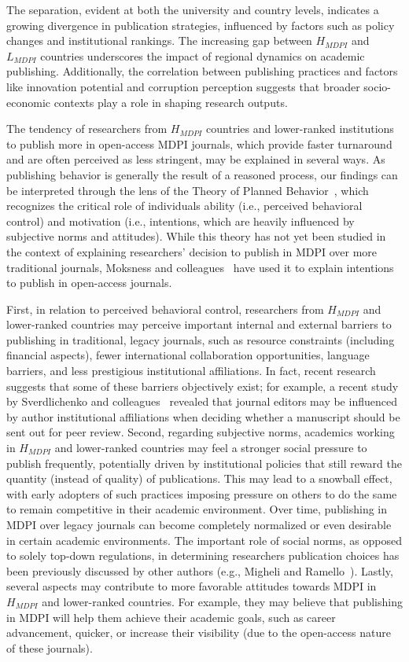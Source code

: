 \documentclass[amsfonts, amssymb, prl, superscriptaddress, notitlepage, twocolumn, nofootinbib]{revtex4-2}
\begin{document}
The separation, evident at both the university and country levels, indicates a growing divergence in publication strategies, influenced by factors such as policy changes and institutional rankings. The increasing gap between $H_{MDPI}$ and $L_{MDPI}$ countries underscores the impact of regional dynamics on academic publishing. Additionally, the correlation between publishing practices and factors like innovation potential and corruption perception suggests that broader socio-economic contexts play a role in shaping research outputs. 

The tendency of researchers from $H_{MDPI}$ countries and lower-ranked institutions to publish more in open-access MDPI journals, which provide faster turnaround and are often perceived as less stringent, may be explained in several ways. As publishing behavior is generally the result of a reasoned process, our findings can be interpreted through the lens of the Theory of Planned Behavior~\cite{ajzen1991}, which recognizes the critical role of individuals ability (i.e., perceived behavioral control) and motivation (i.e., intentions, which are heavily influenced by subjective norms and attitudes). While this theory has not yet been studied in the context of explaining researchers’ decision to publish in MDPI over more traditional journals, Moksness and colleagues~\cite{moksness2020} have used it to explain intentions to publish in open-access journals.

First, in relation to perceived behavioral control, researchers from $H_{MDPI}$ and lower-ranked countries may perceive important internal and external barriers to publishing in traditional, legacy journals, such as resource constraints (including financial aspects), fewer international collaboration opportunities, language barriers, and less prestigious institutional affiliations. In fact, recent research suggests that some of these barriers objectively exist; for example, a recent study by Sverdlichenko and colleagues~\cite{sverdlichenko2022} revealed that journal editors may be influenced by author institutional affiliations when deciding whether a manuscript should be sent out for peer review. Second, regarding subjective norms, academics working in $H_{MDPI}$ and lower-ranked countries may feel a stronger social pressure to publish frequently, potentially driven by institutional policies that still reward the quantity (instead of quality) of publications. This may lead to a snowball effect, with early adopters of such practices imposing pressure on others to do the same to remain competitive in their academic environment. Over time, publishing in MDPI over legacy journals can become completely normalized or even desirable in certain academic environments. The important role of social norms, as opposed to solely top-down regulations, in determining researchers publication choices has been previously discussed by other authors (e.g., Migheli and Ramello~\cite{migheli2013}). Lastly, several aspects may contribute to more favorable attitudes towards MDPI in $H_{MDPI}$ and lower-ranked countries. For example, they may believe that publishing in MDPI will help them achieve their academic goals, such as career advancement, quicker, or increase their visibility (due to the open-access nature of these journals).
\end{document}

